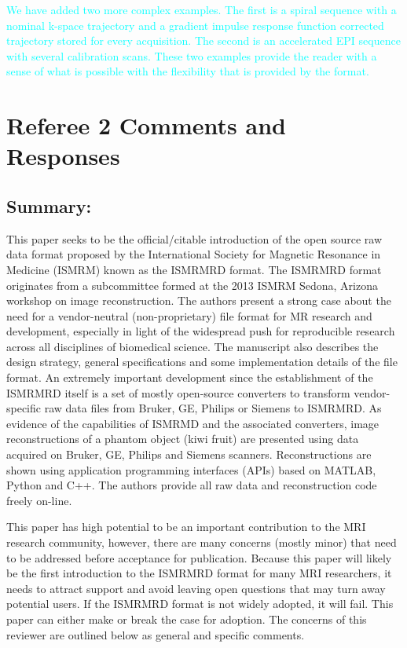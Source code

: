 \documentclass[12pt, draft]{article}
\newcommand{\response}[1]{\textcolor{cyan}{#1}}
\begin{document}
{\begin{itemize}
\response{We have added two more complex examples.  The first is a spiral sequence with a nominal k-space trajectory and a gradient impulse response function corrected trajectory stored for every acquisition.  The second is an accelerated EPI sequence with several calibration scans.  These two examples provide the reader with a sense of what is possible with the flexibility that is provided by the format.}

\end{itemize}

\section*{Referee 2 Comments and Responses}
\subsection*{Summary:}
This paper seeks to be the official/citable introduction of the open source raw data format proposed by the International Society for Magnetic Resonance in Medicine (ISMRM) known as the ISMRMRD format. The ISMRMRD format originates from a subcommittee formed at the 2013 ISMRM Sedona, Arizona workshop on image reconstruction. The authors present a strong case about the need for a vendor-neutral (non-proprietary) file format for MR research and development, especially in light of the widespread push for reproducible research across all disciplines of biomedical science. The manuscript also describes the design strategy, general specifications and some implementation details of the file format. An extremely important development since the establishment of the ISMRMRD itself is a set of mostly open-source converters to transform vendor-specific raw data files from Bruker, GE, Philips or Siemens to ISMRMRD. As evidence of the capabilities of ISMRMD and the associated converters, image reconstructions of a phantom object (kiwi fruit) are presented using data acquired on Bruker, GE, Philips and Siemens scanners. Reconstructions are shown using application programming interfaces (APIs) based on MATLAB, Python and C++. The authors provide all raw data and reconstruction code freely on-line.

This paper has high potential to be an important contribution to the MRI research community, however, there are many concerns (mostly minor) that need to be addressed before acceptance for publication. Because this paper will likely be the first introduction to the ISMRMRD format for many MRI researchers, it needs to attract support and avoid leaving open questions that may turn away potential users. If the ISMRMRD format is not widely adopted, it will fail. This paper can either make or break the case for adoption. The concerns of this reviewer are outlined below as general and specific comments.

}
\end{document}
